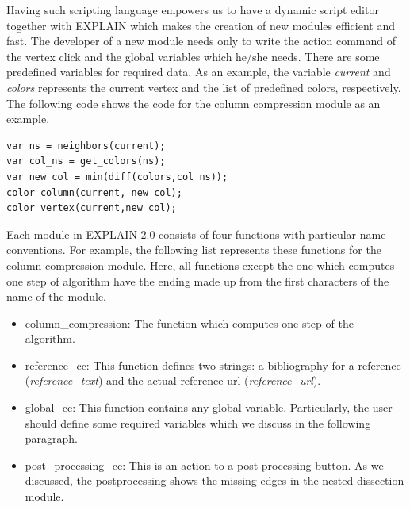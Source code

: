 \documentclass[12pt, twoside,a4paper,toc=bibliography]{scrbook}
\begin{document}
Having such scripting language empowers us to have a dynamic script editor
together with EXPLAIN which makes the creation of new modules efficient and fast.
The developer of a new module needs only to write the action command of the vertex
click and the global variables which he/she needs.
There are some predefined variables for required data.
As an example, the variable \textit{current} and \textit{colors}
represents the current vertex and the list of predefined colors, respectively.
The following code shows the code for the column compression
module as an example.
\begin{lstlisting}
var ns = neighbors(current);
var col_ns = get_colors(ns);
var new_col = min(diff(colors,col_ns));
color_column(current, new_col);
color_vertex(current,new_col);
\end{lstlisting}
Each module in EXPLAIN 2.0 consists of four functions with particular
name conventions. For example, the following list represents these functions
for the column compression module. 
Here, all functions except the one which computes one step of algorithm
have the ending made up from the first characters of the name of the module.
\begin{itemize}
\item column\_compression: The function which computes one step of the algorithm.
\item reference\_cc: This function defines two strings: a bibliography for a reference (\textit{reference\_text}) and the actual reference url (\textit{reference\_url}).
\item global\_cc: This function contains any global variable. Particularly, the user should define some required variables which we discuss in the following paragraph.
\item post\_processing\_cc: This is an action to a post processing button. As we discussed, the postprocessing shows the missing edges in the nested dissection module.
\end{itemize}
\end{document}
